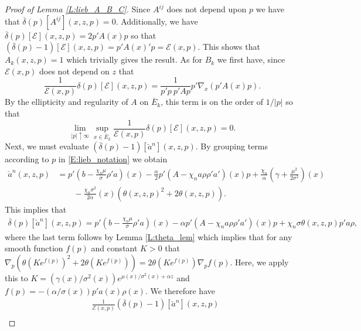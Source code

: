\documentclass[11pt, letterpaper]{amsart}
\theoremstyle{definition}
\theoremstyle{remark}
\numberwithin{equation}{section}
\newcommand{\EN}{\mathcal{E}}
\newcommand{\ol}[1]{\overline{#1}}
\begin{document}
\begin{proof}[Proof of Lemma \ref{L:lieb_A_B_C}]
Since $A^{ij}$ does not depend upon $p$ we have that $\ol{\delta}(p)[A^{ij}](x,z,p) = 0$.  Additionally, we have $\ol{\delta}(p)[\EN](x,z,p) = 2p'A(x)p$ so that $(\ol{\delta}(p)-1)[\EN](x,z,p) = p'A(x)'p = \EN(x,p)$.  This shows that $A_k(x,z,p) = 1$ which trivially gives the result. As for $B_k$ we first have, since $\EN(x,p)$ does not depend on $z$ that
\begin{equation*}
\frac{1}{\EN(x,p)}\delta(p)[\EN](x,z,p) = \frac{1}{p'p\ p'Ap}p'\nabla_x\left(p'A(x)p\right).
\end{equation*}
By the ellipticity and regularity of $A$ on $\ol{E}_k$, this term is on the order of $1/|p|$ so that
\begin{equation*}
\lim_{|p|\uparrow\infty}\sup_{x\in\ol{E}_k}\frac{1}{\EN(x,p)}\delta(p)[\EN](x,z,p) = 0.
\end{equation*}
Next, we must evaluate $(\ol{\delta}(p) -1)[\check{a}^n](x,z,p)$.  By grouping terms according to $p$ in \eqref{E:lieb_notation} we obtain
\begin{equation}\label{E:check_a_n_good}
\begin{split}
\check{a}^n(x,z,p) &= p'\left(b-\frac{\chi_n\mu}{\sigma}\rho'a\right)(x) - \frac{\alpha}{2}p'\left(A-\chi_n a\rho\rho'a'\right)(x)p + \frac{\chi_n}{\alpha}\left(\gamma + \frac{\mu^2}{2\sigma^2}\right)(x)\\
&\qquad - \frac{\chi_n\sigma^2}{2\alpha}(x)\left(\theta(x,z,p)^2 + 2\theta(x,z,p)\right).
\end{split}
\end{equation}
This implies that
\begin{equation}\label{E:check_a_n_p}
\begin{split}
\ol{\delta}(p)[\check{a}^n](x,z,p) = p'\left(b-\frac{\chi_n\mu}{\sigma}\rho'a\right)(x)-\alpha p'\left(A-\chi_n a\rho\rho'a'\right)(x)p + \chi_n\sigma \theta(x,z,p)p'a\rho,
\end{split}
\end{equation}
where the last term follows by Lemma \ref{L:theta_lem} which implies that for any smooth function $f(p)$ and constant $K>0$ that $\nabla_p\left(\theta(Ke^{f(p)})^2 + 2\theta(Ke^{f(p)})\right) = 2\theta(Ke^{f(p)})\nabla_p f(p)$. Here, we apply this to $K = (\gamma(x)/\sigma^2(x))e^{\mu(x)/\sigma^2(x) + \alpha z}$ and $f(p) = -(\alpha/\sigma(x))p'a(x)\rho(x)$.  We therefore have
\begin{equation*}
\begin{split}
&\frac{1}{\EN(x,p)}\left(\ol{\delta}(p)-1\right)[\check{a}^n](x,z,p)\\

\end{split}
\end{equation*}
\end{proof}
\end{document}
